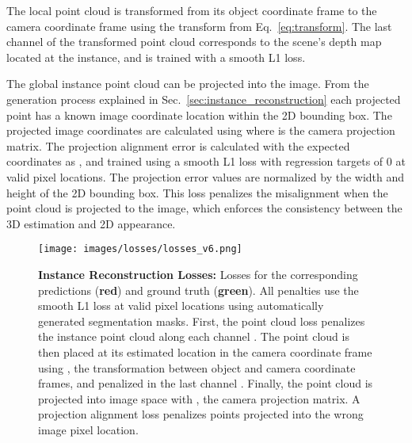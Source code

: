\documentclass[10pt,twocolumn,letterpaper]{article}
\begin{document}
	The local point cloud is transformed from its object coordinate frame to the camera coordinate frame using the transform  from Eq.~\ref{eq:transform}. The last channel of the transformed point cloud corresponds to the scene's depth map located at the instance, and is trained with a smooth L1 loss.
	
	The global instance point cloud can be projected into the image. From the generation process explained in Sec.~\ref{sec:instance_reconstruction} each projected point has a known image coordinate location within the 2D bounding box. The projected image coordinates  are calculated using  where  is the camera projection matrix. The projection alignment error is calculated with the expected coordinates  as , and trained using a smooth L1 loss with regression targets of 0 at valid pixel locations. The projection error values are normalized by the width and height of the 2D bounding box. This loss penalizes the misalignment when the point cloud is projected to the image, which enforces the consistency between the 3D estimation and 2D appearance.
	
	\begin{figure}[t!]
		\begin{center}
			\texttt{[image: images/losses/losses\_v6.png]}
		\end{center}
		\caption{\textbf{Instance Reconstruction Losses:} Losses for the corresponding predictions (\textbf{red}) and ground truth (\textbf{green}). All penalties use the smooth L1 loss at valid pixel locations using automatically generated segmentation masks. First, the point cloud loss penalizes the instance point cloud along each channel . The point cloud is then placed at its estimated location in the camera coordinate frame using , the transformation between object and camera coordinate frames, and penalized in the last channel . Finally, the point cloud is projected into image space with , the camera projection matrix. A projection alignment loss penalizes points projected into the wrong image pixel location.}
		\label{fig:hybrid_losses}
	\end{figure}
	
\end{document}
